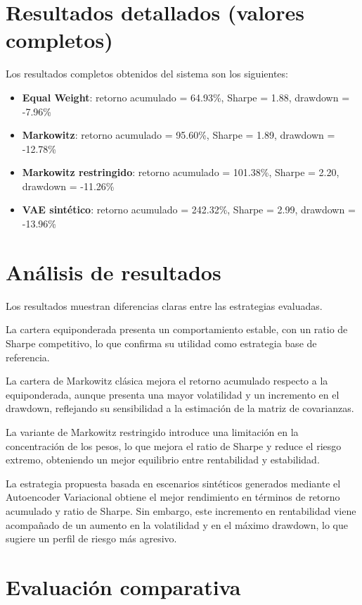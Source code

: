 \section{Resultados detallados (valores completos)}

Los resultados completos obtenidos del sistema son los siguientes:

\begin{itemize}
\item \textbf{Equal Weight}: retorno acumulado = 64.93\%, Sharpe = 1.88, drawdown = -7.96\%
\item \textbf{Markowitz}: retorno acumulado = 95.60\%, Sharpe = 1.89, drawdown = -12.78\%
\item \textbf{Markowitz restringido}: retorno acumulado = 101.38\%, Sharpe = 2.20, drawdown = -11.26\%
\item \textbf{VAE sintético}: retorno acumulado = 242.32\%, Sharpe = 2.99, drawdown = -13.96\%
\end{itemize}

\section{Análisis de resultados}

Los resultados muestran diferencias claras entre las estrategias evaluadas.

La cartera equiponderada presenta un comportamiento estable, con un ratio de Sharpe competitivo, lo que confirma su utilidad como estrategia base de referencia.

La cartera de Markowitz clásica mejora el retorno acumulado respecto a la equiponderada, aunque presenta una mayor volatilidad y un incremento en el drawdown, reflejando su sensibilidad a la estimación de la matriz de covarianzas.

La variante de Markowitz restringido introduce una limitación en la concentración de los pesos, lo que mejora el ratio de Sharpe y reduce el riesgo extremo, obteniendo un mejor equilibrio entre rentabilidad y estabilidad.

La estrategia propuesta basada en escenarios sintéticos generados mediante el Autoencoder Variacional obtiene el mejor rendimiento en términos de retorno acumulado y ratio de Sharpe. Sin embargo, este incremento en rentabilidad viene acompañado de un aumento en la volatilidad y en el máximo drawdown, lo que sugiere un perfil de riesgo más agresivo.

\section{Evaluación comparativa}

